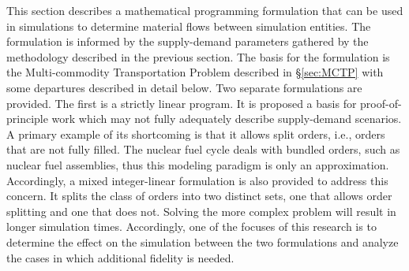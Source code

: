 This section describes a mathematical programming formulation that can be used
in \Cyclus simulations to determine material flows between simulation
entities. The formulation is informed by the supply-demand parameters gathered
by the methodology described in the previous section. The basis for the
formulation is the Multi-commodity Transportation Problem described
in \S\ref{sec:MCTP} with some departures described in detail below. Two separate
formulations are provided. The first is a strictly linear program. It is
proposed a basis for proof-of-principle work which may not fully adequately
describe supply-demand scenarios. A primary example of its shortcoming is that
it allows split orders, i.e., orders that are not fully filled. The nuclear fuel
cycle deals with bundled orders, such as nuclear fuel assemblies, thus this
modeling paradigm is only an approximation. Accordingly, a mixed integer-linear
formulation is also provided to address this concern. It splits the class of
orders into two distinct sets, one that allows order splitting and one that does
not. Solving the more complex problem will result in longer simulation times.
Accordingly, one of the focuses of this research is to determine the effect on
the simulation between the two formulations and analyze the cases in which
additional fidelity is needed.
